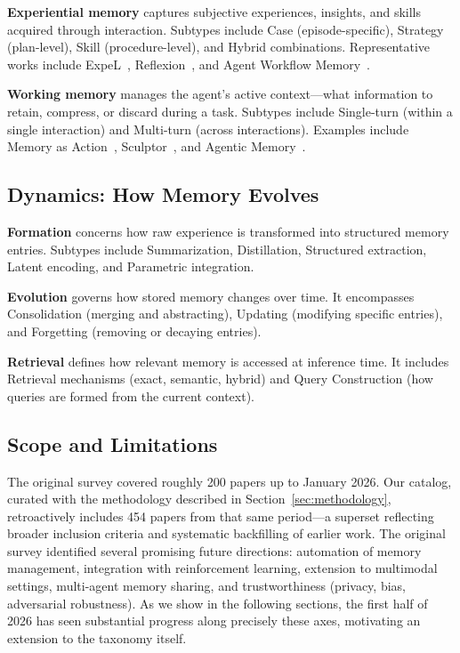 \textbf{Experiential memory} captures subjective experiences, insights, and skills acquired through interaction. Subtypes include Case (episode-specific), Strategy (plan-level), Skill (procedure-level), and Hybrid combinations. Representative works include ExpeL~\cite{Unknown2023ExpeL}, Reflexion~\cite{Unknown2023Reflexion}, and Agent Workflow Memory~\cite{Unknown2024AgentWorkflowMemory}.

\textbf{Working memory} manages the agent's active context---what information to retain, compress, or discard during a task. Subtypes include Single-turn (within a single interaction) and Multi-turn (across interactions). Examples include Memory as Action~\cite{Unknown2025MemoryasAction}, Sculptor~\cite{Unknown2025Sculptor}, and Agentic Memory~\cite{Unknown2026AgenticMemory}.

\subsection{Dynamics: How Memory Evolves}

\textbf{Formation} concerns how raw experience is transformed into structured memory entries. Subtypes include Summarization, Distillation, Structured extraction, Latent encoding, and Parametric integration.

\textbf{Evolution} governs how stored memory changes over time. It encompasses Consolidation (merging and abstracting), Updating (modifying specific entries), and Forgetting (removing or decaying entries).

\textbf{Retrieval} defines how relevant memory is accessed at inference time. It includes Retrieval mechanisms (exact, semantic, hybrid) and Query Construction (how queries are formed from the current context).

\subsection{Scope and Limitations}

The original survey covered roughly 200 papers up to January 2026. Our catalog, curated with the methodology described in Section~\ref{sec:methodology}, retroactively includes 454 papers from that same period---a superset reflecting broader inclusion criteria and systematic backfilling of earlier work. The original survey identified several promising future directions: automation of memory management, integration with reinforcement learning, extension to multimodal settings, multi-agent memory sharing, and trustworthiness (privacy, bias, adversarial robustness). As we show in the following sections, the first half of 2026 has seen substantial progress along precisely these axes, motivating an extension to the taxonomy itself.
